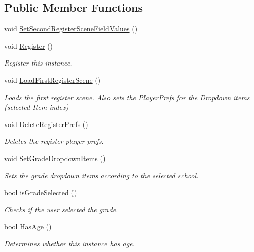 \subsection*{Public Member Functions}
\begin{DoxyCompactItemize}
\item 
void \hyperlink{classRegisterScene2Controller_a7d0ee574e5251ed3274efd394848f602}{Set\+Second\+Register\+Scene\+Field\+Values} ()
\item 
void \hyperlink{classRegisterScene2Controller_acfa9b84015e9ae3e90ca39e532f65343}{Register} ()
\begin{DoxyCompactList}\small\item\em Register this instance. \end{DoxyCompactList}\item 
void \hyperlink{classRegisterScene2Controller_a9ad8791c2b685fb3d25fab78eff03de0}{Load\+First\+Register\+Scene} ()
\begin{DoxyCompactList}\small\item\em Loads the first register scene. Also sets the Player\+Prefs for the Dropdown items (selected Item index) \end{DoxyCompactList}\item 
void \hyperlink{classRegisterScene2Controller_aa22760985ecf5d5fad51395e9925e825}{Delete\+Register\+Prefs} ()
\begin{DoxyCompactList}\small\item\em Deletes the register player prefs. \end{DoxyCompactList}\item 
void \hyperlink{classRegisterScene2Controller_af761b552923dbd0bae2304b4b4f94003}{Set\+Grade\+Dropdown\+Items} ()
\begin{DoxyCompactList}\small\item\em Sets the grade dropdown items according to the selected school. \end{DoxyCompactList}\item 
bool \hyperlink{classRegisterScene2Controller_ac9bd10a18788e75916facefbb141cd8c}{is\+Grade\+Selected} ()
\begin{DoxyCompactList}\small\item\em Checks if the user selected the grade. \end{DoxyCompactList}\item 
bool \hyperlink{classRegisterScene2Controller_ac4411a55424921687efa4e6823ee0873}{Has\+Age} ()
\begin{DoxyCompactList}\small\item\em Determines whether this instance has age. \end{DoxyCompactList}\item 

\end{DoxyCompactItemize}
